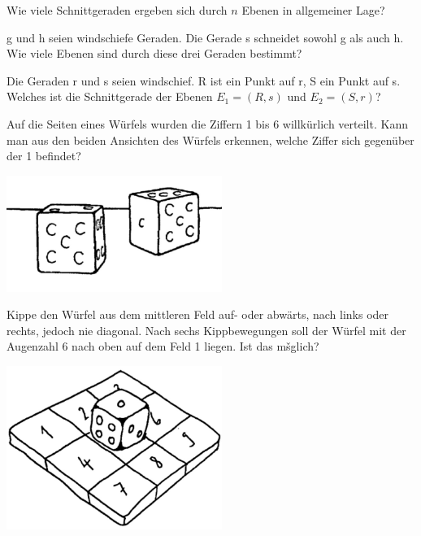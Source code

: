 \documentclass[%
11pt,%
twoside,%
titlepage,%
a4page,%
german,%
headsepline%
]{scrartcl}
\begin{document}
\begin{ueb}
Wie viele Schnittgeraden ergeben sich durch $n$ Ebenen in allgemeiner Lage?
\end{ueb}
\begin{ueb}
g und h seien windschiefe Geraden. Die Gerade s schneidet sowohl g als auch h. Wie viele Ebenen sind durch diese drei Geraden bestimmt?
\end{ueb}
\begin{ueb}
Die Geraden r und s seien windschief. R ist ein Punkt auf r, S ein Punkt auf s. Welches ist die Schnittgerade der Ebenen $E_1=(R,s)$ und $E_2=(S,r)$?
\end{ueb}

\begin{ueb}
Auf die Seiten eines W\"urfels wurden die Ziffern 1 bis 6 willk\"urlich verteilt. Kann man aus den beiden Ansichten des W\"urfels erkennen, welche Ziffer sich gegen\"uber der 1 befindet?
\begin{center}
\includegraphics[width=7cm]{pictures/wuerfel}
\end{center}
\end{ueb}

\begin{ueb}
Kippe den W\"urfel aus dem mittleren Feld auf- oder abw\"arts, nach links oder rechts, jedoch nie diagonal. Nach sechs Kippbewegungen soll der W\"urfel mit der Augenzahl 6 nach oben auf dem Feld 1 liegen. Ist das mšglich?
\begin{center}
\includegraphics[width=7cm]{pictures/wuerfelfeld}
\end{center}
\end{ueb}
\end{document}
